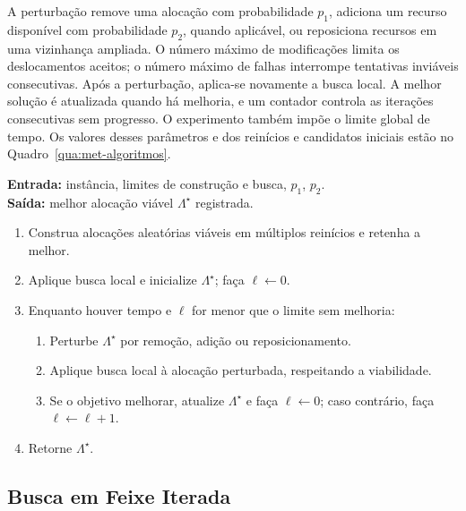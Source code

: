A perturbação remove uma alocação com probabilidade $p_1$, adiciona um
recurso disponível com probabilidade $p_2$, quando aplicável, ou reposiciona
recursos em uma vizinhança ampliada. O número máximo de modificações limita
os deslocamentos aceitos; o número máximo de falhas interrompe tentativas
inviáveis consecutivas. Após a perturbação, aplica-se novamente a busca
local. A melhor solução é atualizada quando há melhoria, e um contador
controla as iterações consecutivas sem progresso. O experimento também
impõe o limite global de tempo. Os valores desses parâmetros e dos
reinícios e candidatos iniciais estão no Quadro~\ref{qua:met-algoritmos}.

\begin{quadro}[htbp]
\centering
\caption{Pseudocódigo da ILS: construção, melhoria e perturbação.}
\label{qua:pseudo-ils}
\begin{minipage}{0.95\textwidth}
\begin{singlespace}
\textbf{Entrada:} instância, limites de construção e busca, $p_1$, $p_2$.\\
\textbf{Saída:} melhor alocação viável $\Lambda^\star$ registrada.
\begin{enumerate}
 \item Construa alocações aleatórias viáveis em múltiplos reinícios e retenha a melhor.
 \item Aplique busca local e inicialize $\Lambda^\star$; faça $\ell\leftarrow0$.
 \item Enquanto houver tempo e $\ell$ for menor que o limite sem melhoria:
 \begin{enumerate}
  \item Perturbe $\Lambda^\star$ por remoção, adição ou reposicionamento.
  \item Aplique busca local à alocação perturbada, respeitando a viabilidade.
  \item Se o objetivo melhorar, atualize $\Lambda^\star$ e faça $\ell\leftarrow0$; caso contrário, faça $\ell\leftarrow\ell+1$.
 \end{enumerate}
 \item Retorne $\Lambda^\star$.
\end{enumerate}
{}
\end{singlespace}
\end{minipage}
\end{quadro}

\subsection{Busca em Feixe Iterada}\label{sec:ibs}

